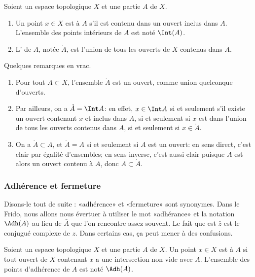 \begin{definition}      \label{DEFooSVWMooLpAVZRInt}
    Soient un espace topologique \( X\) et une partie \( A\) de \( X\).
    \begin{enumerate}
        \item
            Un point \( x\in X\) est  à \( A\) s'il est contenu dans un ouvert inclus dans \( A\). L'ensemble des points intérieurs de \( A\) est noté $\Int(A)$.
        \item
            L' de \( A\), notée \( \mathring A\), est l'union de tous les ouverts de \( X\) contenus dans \( A\).
    \end{enumerate}
\end{definition}
\begin{remark}\label{RemIntOuvert}
Quelques remarques en vrac.
\begin{enumerate}
\item Pour tout \( A \subset X\), l'ensemble \( \mathring A\) est un ouvert, comme union quelconque d'ouverts.

\item Par ailleurs, on a \( \mathring A = \Int A \): en effet, \( x \in \Int A \) si et seulement s'il existe un ouvert contenant \( x \) et inclus dans \( A \), si et seulement si \( x \) est dans l'union de tous les ouverts contenus dans \( A \), si et seulement si \( x \in \mathring A \).

\item On a  \( \mathring A \subset A \), et \( \mathring A = A \) si et seulement si $A$ est un ouvert: en sens direct, c'est clair par égalité d'ensembles; en sens inverse, c'est aussi clair puisque $A$ est alors un ouvert contenu à $A$, donc  \( A \subset \mathring A \).
\end{enumerate}
\end{remark}

\subsubsection{Adhérence et fermeture}

Disons-le tout de suite : «adhérence» et «fermeture» sont synonymes. Dans le Frido, nous allons nous évertuer à utiliser le mot «adhérance» et la notation \( \Adh(A)\) au lieu de \( \bar A\) que l'on rencontre assez souvent. Le fait que est \( \bar z\) est le conjugué complexe de \( z\). Dans certains cas, ça peut mener à des confusions.
\begin{definition}      \label{DEFooSVWMooLpAVZR}
    Soient un espace topologique \( X\) et une partie \( A\) de \( X\). Un point \( x\in X\) est  à \( A\) si tout ouvert de \( X\) contenant \( x\) a une intersection non vide avec \( A\). L'ensemble des points d'adhérence de \( A\) est noté $\Adh(A)$.
\end{definition}

